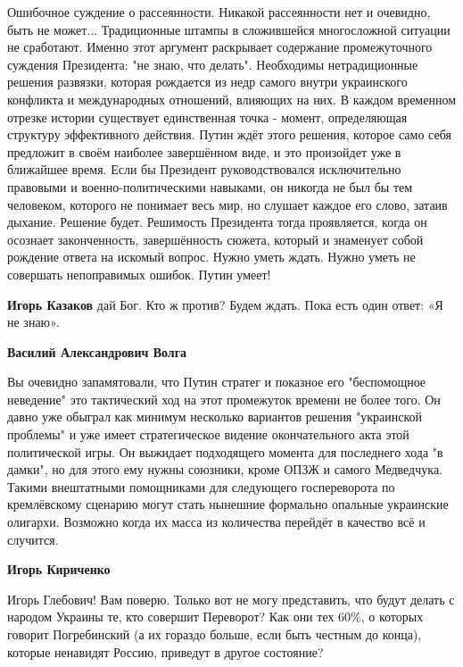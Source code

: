 \begin{itemize}
Ошибочное суждение о рассеянности. Никакой рассеянности нет и очевидно, быть не
может... Традиционные штампы в сложившейся многосложной ситуации не сработают.
Именно этот аргумент раскрывает содержание промежуточного суждения Президента:
"не знаю, что делать". Необходимы нетрадиционные решения развязки, которая
рождается из недр самого внутри украинского конфликта и международных
отношений, влияющих на них. В каждом временном отрезке истории существует
единственная точка - момент, определяющая структуру эффективного действия.
Путин ждёт этого решения, которое само себя предложит в своём наиболее
завершённом виде, и это произойдет уже в ближайшее время. Если бы Президент
руководствовался исключительно правовыми и военно-политическими навыками, он
никогда не был бы тем человеком, которого не понимает весь мир, но слушает
каждое его слово, затаив дыхание. Решение будет. Решимость Президента тогда
проявляется, когда он осознает законченность, завершённость сюжета, который и
знаменует собой рождение ответа на искомый вопрос. Нужно уметь ждать. Нужно
уметь не совершать непоправимых ошибок. Путин умеет!

\begin{itemize} %
\textbf{Игорь Казаков} дай Бог. Кто ж против? Будем ждать. Пока есть один ответ: «Я не знаю».

\textbf{Василий Александрович Волга} 

Вы очевидно запамятовали, что Путин стратег и показное его "беспомощное
неведение" это тактический ход на этот промежуток времени не более того. Он
давно уже обыграл как минимум несколько вариантов решения "украинской проблемы"
и уже имеет стратегическое видение окончательного акта этой политической игры.
Он выжидает подходящего момента для последнего хода "в дамки", но для этого ему
нужны союзники, кроме ОПЗЖ и самого Медведчука. Такими внештатными помощниками
для следующего госпереворота по кремлёвскому сценарию могут стать нынешние
формально опальные украинские олигархи. Возможно когда их масса из количества
перейдёт в качество всё и случится.

\textbf{Игорь Кириченко} 

Игорь Глебович! Вам поверю. Только вот не могу представить, что будут делать с
народом Украины те, кто совершит Переворот? Как они тех 60\%, о которых говорит
Погребинский (а их гораздо больше, если быть честным до конца), которые
ненавидят Россию, приведут в другое состояние?


\end{itemize}
\end{itemize}
